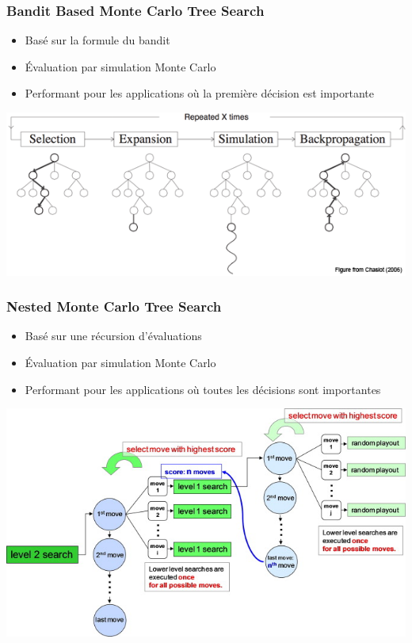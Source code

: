 \documentclass{beamer}
\begin{document}
\begin{frame}
    \frametitle{Bandit Based Monte Carlo Tree Search}
    \begin{itemize}
        \item Basé sur la formule du bandit
        \item Évaluation par simulation Monte Carlo
        \item Performant pour les applications où la première décision est importante
    \end{itemize}
    \begin{center}
        \includegraphics[scale=0.5]{mcts-algorithm.png}
    \end{center}

\end{frame}

\begin{frame}
    \frametitle{Nested Monte Carlo Tree Search}
    \begin{itemize}
        \item Basé sur une récursion d'évaluations
        \item Évaluation par simulation Monte Carlo
        \item Performant pour les applications où toutes les décisions sont importantes
    \end{itemize}
    \begin{center}
        \includegraphics[scale=0.5]{nested-algorithm.jpg}
    \end{center}

\end{frame}
\end{document}
